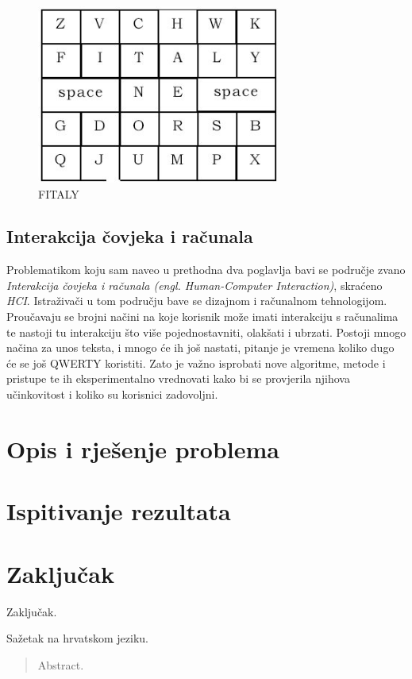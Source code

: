 \documentclass[times, utf8, zavrsni]{fer}
\begin{document}
\begin{figure}[htb]
\centering
\includegraphics[width=8cm]{img/fitaly.jpg}
\caption{FITALY}
\label{fig:fitaly}
\end{figure}

\clearpage

\section{Interakcija čovjeka i računala}
Problematikom koju sam naveo u prethodna dva poglavlja bavi se područje zvano \emph{Interakcija čovjeka i računala (engl. Human-Computer Interaction)}, skraćeno \emph{HCI}. Istraživači u tom području bave se dizajnom i računalnom tehnologijom. Proučavaju se brojni načini na koje korisnik može imati interakciju s računalima te nastoji tu interakciju što više pojednostavniti, olakšati i ubrzati. Postoji mnogo načina za unos teksta, i mnogo će ih još nastati, pitanje je vremena koliko dugo će se još QWERTY koristiti. Zato je važno isprobati nove algoritme, metode i pristupe te ih eksperimentalno vrednovati kako bi se provjerila njihova učinkovitost i koliko su korisnici zadovoljni.

\chapter{Opis i rješenje problema}

\chapter{Ispitivanje rezultata}

\chapter{Zaključak}
Zaključak.




\begin{sazetak}
Sažetak na hrvatskom jeziku.

\end{sazetak}

\begin{abstract}
Abstract.	

\end{abstract}
\end{document}
